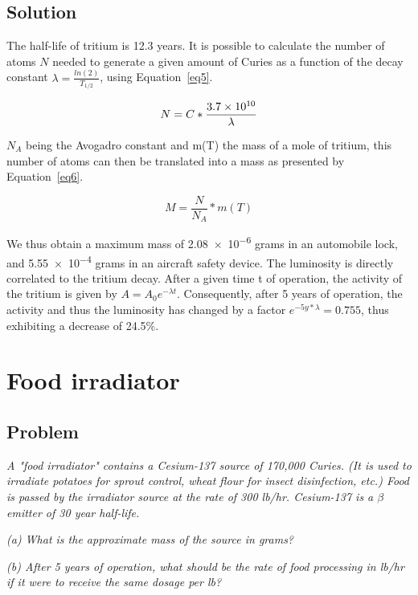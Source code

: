 \subsection{Solution}

The half-life of tritium is 12.3 years. It is possible to calculate the number of atoms $N$ needed to generate a given amount of Curies as a function of the decay constant $\lambda = \frac{ln(2)}{T_{1/2}}$, using Equation~\ref{eq5}.


\begin{equation}\label{eq5}
N = C * \frac{\text{\num{3.7e10}}}{\lambda}
\end{equation}

$N_A$ being the Avogadro constant and m(T) the mass of a mole of tritium, this number of atoms can then be translated into a mass as presented by Equation~\ref{eq6}.


\begin{equation}\label{eq6}
M = \frac{N}{N_A} * m(T)
\end{equation}

We thus obtain a maximum mass of \num{2.08e-6} grams in an automobile lock, and \num{5.55e-4} grams in an aircraft safety device. The luminosity is directly correlated to the tritium decay. After a given time t of operation, the activity of the tritium is given by $A = A_0e^{-\lambda t}$. Consequently, after 5 years of operation, the activity and thus the luminosity has changed by a factor $e^{-5y*\lambda} = 0.755$, thus exhibiting a decrease of 24.5\%.


\section{Food irradiator}

\subsection{Problem}

\textit{A "food irradiator" contains a Cesium-137 source of 170,000 Curies. (It is used to irradiate potatoes for sprout control, wheat flour for insect disinfection, etc.) Food is passed by the irradiator source at the rate of 300 lb/hr. Cesium-137 is a $\beta$ emitter of 30 year half-life.}

\textit{(a) What is the approximate mass of the source in grams?}

\textit{(b) After 5 years of operation, what should be the rate of food processing in lb/hr if it were to receive the same dosage per lb?}

